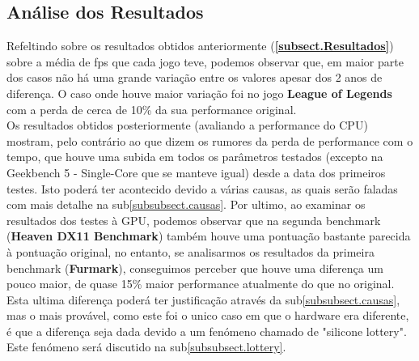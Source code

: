 \documentclass{report}
\begin{document}
\subsection{Análise dos Resultados}
\label{subsect.Análise}
	\begin{large}
		Refeltindo sobre os resultados obtidos anteriormente (\textbf{\autoref{subsect.Resultados}}) sobre a média de \ac{fps} que cada jogo teve, podemos observar que, em maior parte dos casos não há uma grande variação entre os valores apesar dos 2 anos de diferença. O caso onde houve maior variação foi no jogo \textbf{League of Legends} com a perda de cerca de 10\% da sua performance original.\\
		Os resultados obtidos posteriormente (avaliando a performance do CPU) mostram, pelo contrário ao que dizem os rumores da perda de performance com o tempo, que houve uma subida em todos os parâmetros testados (excepto na Geekbench 5 - Single-Core que se manteve igual) desde a data dos primeiros testes. Isto poderá ter acontecido devido a várias causas, as quais serão faladas com mais detalhe na sub\autoref{subsubsect.causas}.
		Por ultimo, ao examinar os resultados dos testes à \ac{GPU}, podemos observar que na segunda benchmark (\textbf{Heaven DX11 Benchmark}) também houve uma pontuação bastante parecida à pontuação original, no entanto, se analisarmos os resultados da primeira benchmark (\textbf{Furmark}), conseguimos perceber que houve uma diferença um pouco maior, de quase 15\% maior performance atualmente do que no original. Esta ultima diferença poderá ter justificação através da sub\autoref{subsubsect.causas}, mas o mais provável, como este foi o unico caso em que o hardware era diferente, é que a diferença seja dada devido a um fenómeno chamado de "silicone lottery". Este fenómeno será discutido na sub\autoref{subsubsect.lottery}.
	\end{large}
	
\end{document}

